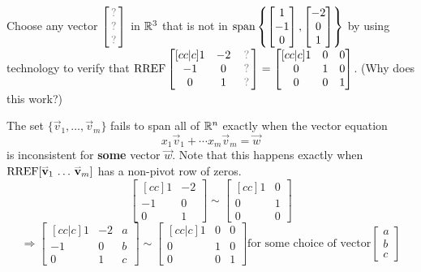 \begin{activity}{15}
  Choose any vector \(\begin{bmatrix}\unknown\\\unknown\\\unknown\end{bmatrix}\)
  in \(\mathbb{R}^3\) that is not in
  \(\operatorname{span}\left\{\begin{bmatrix}1\\-1\\0\end{bmatrix},
  \begin{bmatrix}-2\\0\\1\end{bmatrix}\right\}\) by using technology to verify that
  \(
    \RREF
    \begin{bmatrix}[cc|c]1&-2&\unknown\\-1&0&\unknown\\0&1&\unknown\end{bmatrix}
      =
    \begin{bmatrix}[cc|c]1&0&0\\0&1&0\\0&0&1\end{bmatrix}
  \).
  (Why does this work?)
\end{activity}

\begin{fact}
  The set \(\{\vec v_1,\dots,\vec v_m\}\) fails to span all of \(\mathbb{R}^n\)
  exactly when the vector equation
	\[ x_1 \vec{v}_1 + \cdots x_m\vec{v}_m = \vec{w} \]
  is inconsistent for \textbf{some} vector \(\vec{w}\).
  \vfill
  Note that this happens exactly when \(\operatorname{RREF}[\mathbf{\accentset{\rightharpoonup}{v}}_1\,\dots\,\mathbf{\accentset{\rightharpoonup}{v}}_m]\) has a non-pivot row of zeros.
  \[\begin{bmatrix}[cc]1&-2\\-1&0\\0&1\end{bmatrix}\sim
  \begin{bmatrix}[cc]1&0\\0&1\\0&0\end{bmatrix}\]
  \[\Rightarrow
  \begin{bmatrix}[cc|c]1&-2&a\\-1&0&b\\0&1&c\end{bmatrix}\sim
  \begin{bmatrix}[cc|c]1&0&0\\0&1&0\\0&0&1\end{bmatrix}
  \text{for some choice of vector} \begin{bmatrix} a \\ b \\ c \end{bmatrix} \]
\end{fact}

